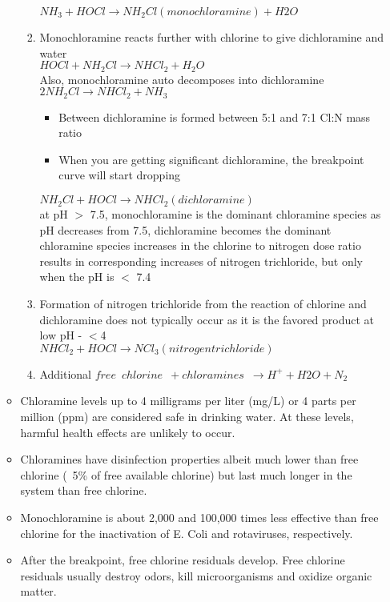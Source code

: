 \begin{itemize}
\begin{itemize}
\begin{enumerate}
					$NH_3 + HOCl   \rightarrow NH_2Cl (monochloramine) + H2O$\\
					\item Monochloramine reacts further with chlorine to give dichloramine and water\\
					$HOCl + NH_2Cl \rightarrow NHCl_2 + H_2O$\\
					Also, monochloramine auto decomposes into dichloramine\\
					$2NH_2Cl \rightarrow NHCl_2 + NH_3$
						\begin{itemize}
							\item Between dichloramine is formed between 5:1 and 7:1 Cl:N mass ratio
							\item When you are getting significant dichloramine, the breakpoint curve will start dropping
						\end{itemize}
						$NH_2Cl + HOCl  \rightarrow NHCl_2 (dichloramine)$\\
						at pH $>$ 7.5, monochloramine is the dominant chloramine species as pH decreases from 7.5, dichloramine becomes the dominant chloramine species increases in the chlorine to nitrogen dose ratio results in corresponding increases of nitrogen trichloride, but only when the pH is $<$ 7.4\\
					\item Formation of nitrogen trichloride from the reaction of chlorine and dichloramine does not typically occur as it is the favored product at low pH - $<$4\\
					$NHCl_2 + HOCl  \rightarrow NCl_3 (nitrogen trichloride)$\\
					\item Additional $free \enspace chlorine \enspace + chloramines \enspace \rightarrow H^+ + H2O + N_2$
				\end{enumerate}
				\item Chloramine levels up to 4 milligrams per liter (mg/L) or 4 parts per million (ppm) are considered safe in drinking water. At these levels, harmful health effects are unlikely to occur.				
				\item Chloramines have disinfection properties albeit much lower than free chlorine (~5\% of free available chlorine) but last much longer in the system than free chlorine. 
				\item Monochloramine is about 2,000 and 100,000 times less effective than free chlorine for the inactivation of E. Coli and rotaviruses, respectively.
				\item After the breakpoint, free chlorine residuals develop. Free chlorine residuals usually destroy odors, kill microorganisms and oxidize organic matter.

\end{itemize}
\end{itemize}
